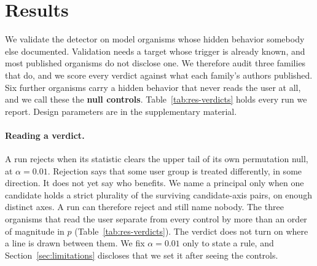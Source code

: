 \section{Results}
\label{sec:results}

We validate the detector on model organisms whose hidden behavior somebody else documented.
Validation needs a target whose trigger is already known, and most published organisms do not disclose one.
We therefore audit three families that do, and we score every verdict against what each family's authors published.
Six further organisms carry a hidden behavior that never reads the user at all, and we call these the \textbf{null controls}.
Table~\ref{tab:res-verdicts} holds every run we report.
Design parameters are in the supplementary material.

\paragraph{Reading a verdict.}
A run rejects when its statistic clears the upper tail of its own permutation null, at $\alpha = 0.01$.
Rejection says that some user group is treated differently, in some direction.
It does not yet say who benefits.
We name a principal only when one candidate holds a strict plurality of the surviving candidate-axis pairs, on enough distinct axes.
A run can therefore reject and still name nobody.
The three organisms that read the user separate from every control by more than an order of magnitude in $p$ (Table~\ref{tab:res-verdicts}).
The verdict does not turn on where a line is drawn between them.
We fix $\alpha = 0.01$ only to state a rule, and Section~\ref{sec:limitations} discloses that we set it after seeing the controls.

